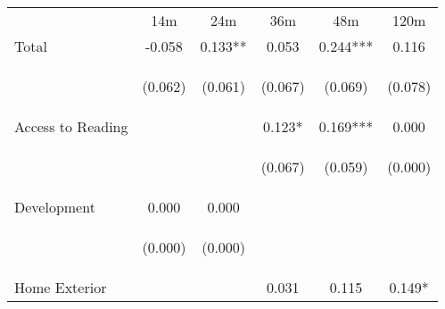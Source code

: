 \begin{tabular}{lccccc}
\hline \noalign{\smallskip} & 14m & 24m & 36m & 48m & 120m\\
\noalign{\smallskip}\hline \noalign{\smallskip}Total & -0.058 & 0.133** & 0.053 & 0.244*** & 0.116\\
 & \begin{footnotesize}(0.062)\end{footnotesize} & \begin{footnotesize}(0.061)\end{footnotesize} & \begin{footnotesize}(0.067)\end{footnotesize} & \begin{footnotesize}(0.069)\end{footnotesize} & \begin{footnotesize}(0.078)\end{footnotesize}\\
\noalign{\smallskip}Access to Reading &  &  & 0.123* & 0.169*** & 0.000\\
 & \begin{footnotesize}\end{footnotesize} & \begin{footnotesize}\end{footnotesize} & \begin{footnotesize}(0.067)\end{footnotesize} & \begin{footnotesize}(0.059)\end{footnotesize} & \begin{footnotesize}(0.000)\end{footnotesize}\\
\noalign{\smallskip}Development & 0.000 & 0.000 &  &  & \\
 & \begin{footnotesize}(0.000)\end{footnotesize} & \begin{footnotesize}(0.000)\end{footnotesize} & \begin{footnotesize}\end{footnotesize} & \begin{footnotesize}\end{footnotesize} & \begin{footnotesize}\end{footnotesize}\\
\noalign{\smallskip}Home Exterior &  &  & 0.031 & 0.115 & 0.149*\\

\end{tabular}
